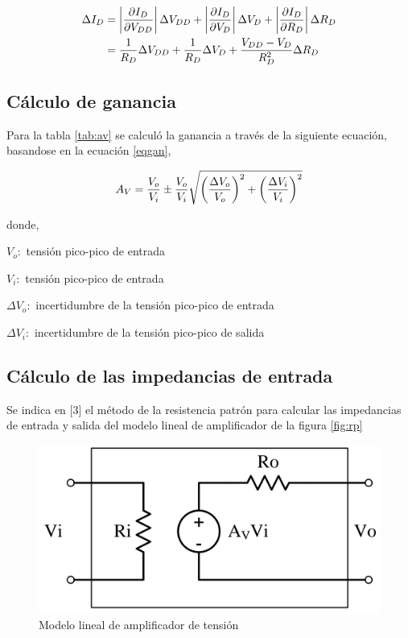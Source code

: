 \documentclass[12pt, a4paper]{article}
\begin{document}
    \begin{equation}
        \begin{split}
            \Delta I_D & = \left | \frac{\partial I_D}{\partial V_{DD}} \right | \Delta V_{DD} + \left | \frac{\partial I_D}{\partial V_D} \right | \Delta V_D + \left | \frac{\partial I_D}{\partial R_D} \right | \Delta R_D \\
            & = {1 \over R_D} \Delta V_{DD} + {1 \over R_D} \Delta V_D + \frac{V_{DD}-V_D}{R_D^2} \Delta R_D
        \end{split}
        \label{Qeq4}
    \end{equation}

    \subsection{Cálculo de ganancia}

    Para la tabla \ref{tab:av} se calculó la ganancia a través de la siguiente ecuación, basandose en la ecuación \eqref{eqgan},

    \begin{equation} \label{eqAv}
        A_V = {V_o \over V_i} \pm {V_o \over V_i}\sqrt{\left( {\Delta V_o \over V_o} \right)^2 + \left( {\Delta V_i \over V_i} \right)^2}
    \end{equation}

    donde,

    $V_o :$ tensión pico-pico de entrada

    $V_i :$ tensión pico-pico de entrada

    $\Delta V_o :$ incertidumbre de la tensión pico-pico de entrada

    $\Delta V_i :$ incertidumbre de la tensión pico-pico de salida

    \subsection{Cálculo de las impedancias de entrada}

    Se indica en [3] el método de la resistencia patrón para calcular las impedancias de entrada y salida del modelo lineal de amplificador de la figura \ref{fig:rp}

    \begin{figure}
        \centering
        \includegraphics[height=5cm\textwidth]{zio.jpg}
        \caption{Modelo lineal de amplificador de tensión}
        \label{fig:zio}
    \end{figure}
\end{document}
